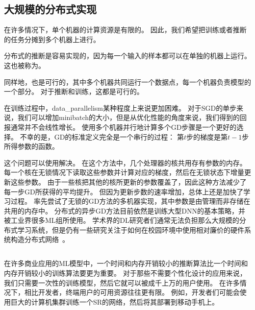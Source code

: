 \subsection{大规模的分布式实现}
\label{sec:large_scale_distributed_implementations}

在许多情况下，单个机器的计算资源是有限的。
因此，我们希望把训练或者推断的任务分摊到多个机器上进行。

分布式的推断是容易实现的，因为每一个输入的样本都可以在单独的机器上运行。
这也被称为。

同样地，也是可行的，其中多个机器共同运行一个数据点，每一个机器负责模型的一个部分。
对于推断和训练，这都是可行的。



在训练过程中，\gls{data_parallelism}某种程度上来说更加困难。
对于\gls{SGD}的单步来说，我们可以增加\gls{minibatch}的大小，但是从优化性能的角度来说，我们得到的回报通常并不会线性增长。
使用多个机器并行地计算多个\gls{GD}步骤是一个更好的选择。
不幸的是，\gls{GD}的标准定义完全是一个串行的过程：
第$t$步的梯度是第$t-1$步所得参数的函数。


这个问题可以使用\citep{BenDucVin01-small,Recht-et-al-NIPS2011}解决。
在这个方法中，几个处理器的核共用存有参数的内存。
每一个核在无锁情况下读取这些参数并计算对应的梯度，然后在无锁状态下增量更新这些参数。
由于一些核把其他的核所更新的参数覆盖了，因此这种方法减少了每一步\gls{GD}所获得的平均提升。
但因为更新步数的速率增加，总体上还是加快了学习过程。
\citet{Dean-et-al-NIPS2012}率先尝试了无锁的\gls{GD}方法的多机器实现，其中参数是由管理而非存储在共用的内存中。
分布式的异步\gls{GD}方法目前依然是训练大型\gls{DNN}的基本策略，并被工业界很多\gls{ML}组所使用\citep{chilimbi2014project,Wu-et-al-arXiv2015}。
学术界的\gls{DL}研究者们通常无法负担那么大规模的分布式学习系统，但是仍有一些研究关注于如何在校园环境中使用相对廉价的硬件系统构造分布式网络~\citep{icml2013_coates13}。


\subsection{}
\label{sec:model_compression}

在许多商业应用的\gls{ML}模型中，一个时间和内存开销较小的推断算法比一个时间和内存开销较小的训练算法要更为重要。
对于那些不需要个性化设计的应用来说，我们只需要一次性的训练模型，然后它就可以被成千上万的用户使用。
在许多情况下，相比开发者，终端用户的可用资源往往更有限。
例如，开发者们可能会使用巨大的计算机集群训练一个\gls{SR}的网络，然后将其部署到移动手机上。


